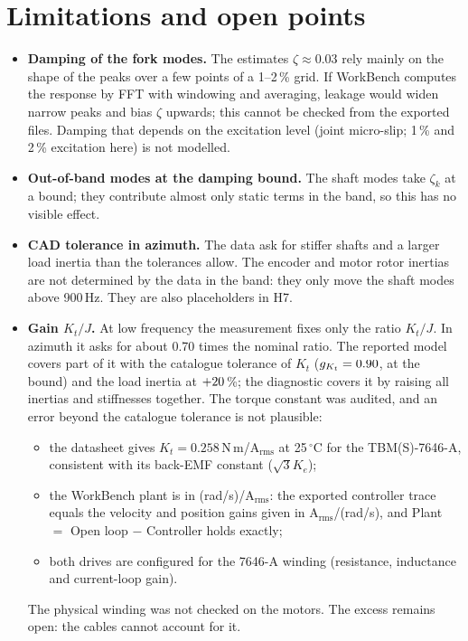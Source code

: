 \documentclass[10pt,a4paper]{article}
\numberwithin{equation}{section}
\begin{document}
\section{Limitations and open points}\label{sec:limits}
\begin{itemize}
\item \textbf{Damping of the fork modes.} The estimates $\zeta\approx0.03$ rely mainly on the shape of the peaks over a few points of a 1--2\,\% grid. If WorkBench computes the response by FFT with windowing and averaging, leakage would widen narrow peaks and bias $\zeta$ upwards; this cannot be checked from the exported files. Damping that depends on the excitation level (joint micro-slip; 1\,\% and 2\,\% excitation here) is not modelled.
\item \textbf{Out-of-band modes at the damping bound.} The shaft modes take $\zeta_k$ at a bound; they contribute almost only static terms in the band, so this has no visible effect.
\item \textbf{CAD tolerance in azimuth.} The data ask for stiffer shafts and a larger load inertia than the tolerances allow. The encoder and motor rotor inertias are not determined by the data in the band: they only move the shaft modes above 900\,Hz. They are also placeholders in H7.
\item \textbf{Gain $K_t/J$.} At low frequency the measurement fixes only the ratio $K_t/J$. In azimuth it asks for about 0.70 times the nominal ratio. The reported model covers part of it with the catalogue tolerance of $K_t$ ($g_{K_t}=0.90$, at the bound) and the load inertia at $+20$\,\%; the diagnostic covers it by raising all inertias and stiffnesses together. The torque constant was audited, and an error beyond the catalogue tolerance is not plausible:
  \begin{itemize}
  \item the datasheet gives $K_t=0.258$\,N\,m/A$_\mathrm{rms}$ at 25\,$^\circ$C for the TBM(S)-7646-A, consistent with its back-EMF constant ($\sqrt3K_e$);
  \item the WorkBench plant is in (rad/s)/A$_\mathrm{rms}$: the exported controller trace equals the velocity and position gains given in A$_\mathrm{rms}$/(rad/s), and Plant $=$ Open loop $-$ Controller holds exactly;
  \item both drives are configured for the 7646-A winding (resistance, inductance and current-loop gain).
  \end{itemize}
  The physical winding was not checked on the motors. The excess remains open: the cables cannot account for it.

\end{itemize}
\end{document}
